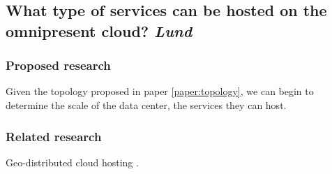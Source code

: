 \subsection{What type of services can be hosted on the omnipresent cloud? \emph{Lund}}
\subsubsection{Proposed research}
Given the topology proposed in paper \ref{paper:topology}, we can begin to determine the scale of the data center, the services they can host. 


\subsubsection{Related research}
Geo-distributed cloud hosting \cite{agarwal2010volley}.